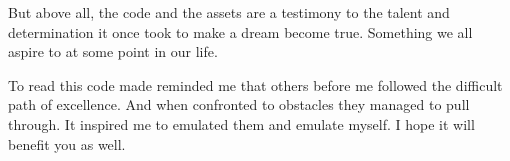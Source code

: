 \documentclass[book.tex]{subfiles}
\begin{document}
\bigskip

 But above all, the code and the assets are a testimony to the talent and determination it once took to make a dream become true. Something we all aspire to at some point in our life. 
\bigskip

To read this code made reminded me that others before me followed the difficult path of excellence. And when confronted to obstacles they managed to pull through. It inspired me to emulated them and emulate myself. I hope it will benefit you as well.
\end{document}

